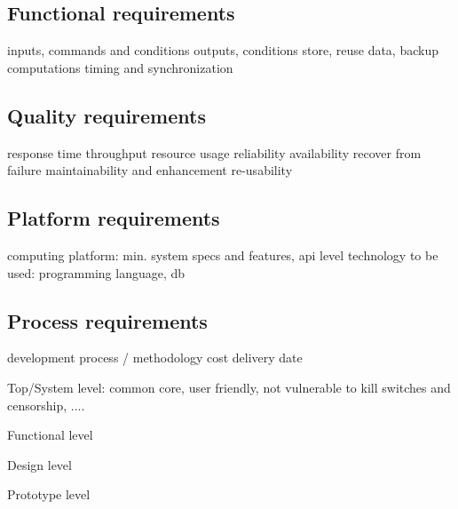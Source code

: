 \subsection{Functional requirements} %

inputs, commands and conditions
outputs, conditions
store, reuse data, backup
computations
timing and synchronization

\subsection{Quality requirements}

response time
throughput
resource usage
reliability
availability
recover from failure
maintainability and enhancement
re-usability

\subsection{Platform requirements}

computing platform: min. system specs and features, api level
technology to be used: programming language, db

\subsection{Process requirements}

development process / methodology
cost
delivery date






Top/System level: common core, user friendly, not vulnerable to kill switches and censorship, ....


Functional level

Design level

Prototype level




